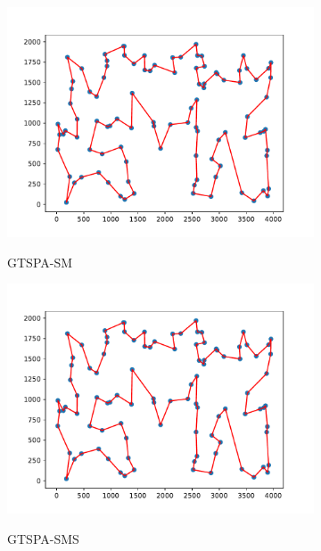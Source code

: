 \documentclass[12pt]{article}
\theoremstyle{plain}
\theoremstyle{definition}
\theoremstyle{remark}
\begin{document}
\begin{figure}[ht]
\begin{subfigure}{.5\textwidth}
		\includegraphics[scale = 0.44]{../../Implementation/gen/best_path_gtspasm_kroA100}
		\label{fig:best_path_gtspasm_kroA100}
		\caption{GTSPA-SM}
	\end{subfigure}%
	\begin{subfigure}{.5\textwidth}
		\centering
		\includegraphics[scale = 0.44]{../../Implementation/gen/best_path_gtspasms_kroA100}
		\label{fig:best_path_gtspasms_kroA100}
		\caption{GTSPA-SMS}
	\end{subfigure}
	\begin{subfigure}{.5\textwidth}
		\centering

\end{subfigure}
\end{figure}
\end{document}
